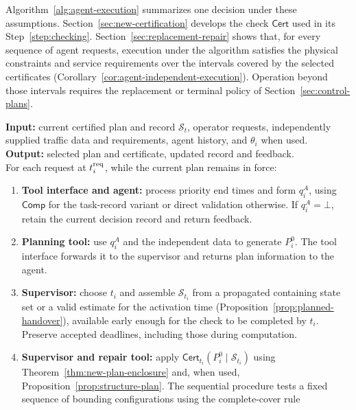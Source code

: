\documentclass[final]{cas-sc}
\theoremstyle{definition}
\theoremstyle{plain}
\theoremstyle{definition}
\theoremstyle{plain}
\begin{document}
Algorithm~\ref{alg:agent-execution} summarizes one decision under
these assumptions. Section~\ref{sec:new-certification} develops the check
$\mathsf{Cert}$ used in its Step~\ref{step:checking}.
Section~\ref{sec:replacement-repair} shows that, for every sequence of
agent requests, execution under the algorithm
satisfies the physical constraints and service requirements over the
intervals covered by the selected certificates
(Corollary~\ref{cor:agent-independent-execution}). Operation beyond those intervals
requires the replacement or terminal policy of
Section~\ref{sec:control-plans}.

\begin{algorithm}[!htbp]
\caption{Planning requests and certified execution}
\label{alg:agent-execution}
\begin{minipage}{\linewidth}
\small
\textbf{Input:} current certified plan and record $\mathcal S_t$,
operator requests, independently supplied traffic data and
requirements, agent history, and $\theta_i$ when used.\\
\textbf{Output:} selected plan and certificate, updated record and
feedback.\\
For each request at $t_i^{\rm req}$, while the current plan remains in
force:
\begin{enumerate}
\setlength{\itemsep}{2pt}
\item\label{step:request} \textbf{Tool interface and agent:} process priority end times
and form $q_i^{A}$, using $\mathsf{Comp}$ for the task-record variant
or direct validation otherwise. If $q_i^{A}=\bot$, retain the current
decision record and return feedback.
\item\label{step:planning} \textbf{Planning tool:} use $q_i^{A}$ and the independent data
to generate $P_i^{0}$. The tool interface forwards it to the
supervisor and returns plan information to the agent.
\item\label{step:activation} \textbf{Supervisor:} choose $t_i$ and assemble
$\mathcal S_{t_i}$ from a propagated containing state set or a valid
estimate for the activation time (Proposition~\ref{prop:planned-handover}),
available early enough for the check to be completed by $t_i$.
Preserve accepted deadlines, including those during computation.
\item\label{step:checking} \textbf{Supervisor and repair tool:} apply
$\mathsf{Cert}_{t_i}(P_i^{0}\mid\mathcal S_{t_i})$ using
Theorem~\ref{thm:new-plan-enclosure} and, when used,
Proposition~\ref{prop:structure-plan}. The sequential procedure tests a fixed
sequence of bounding configurations using the complete-cover rule

\end{enumerate}
\end{minipage}
\end{algorithm}
\end{document}
